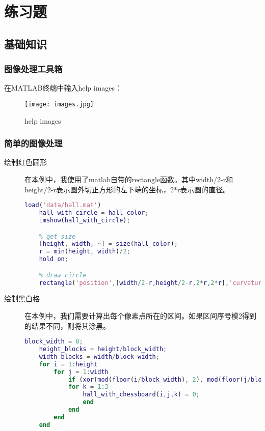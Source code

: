 \documentclass[a4paper]{article}
\begin{document}
\section{练习题}

\subsection{基础知识}
\subsubsection{图像处理工具箱}
\par 在MATLAB终端中输入help images：

\begin{figure}[ht]
     \centering
     \texttt{[image: images.jpg]}
     \caption{help images}
    \label{fig:help images}
\end{figure}

\subsubsection{简单的图像处理}
\begin{description}
    \item[绘制红色圆形] 
    \par 在本例中，我使用了matlab自带的rectangle函数。其中width/2-r和height/2-r表示圆外切正方形的左下端的坐标，2*r表示圆的直径。
    \begin{lstlisting}[language=matlab, caption=绘制红色圆形]
    load('data/hall.mat')
    hall_with_circle = hall_color;
    imshow(hall_with_circle);

    % get size
    [height, width, ~] = size(hall_color);
    r = min(height, width)/2;
    hold on;

    % draw circle
    rectangle('position',[width/2-r,height/2-r,2*r,2*r],'curvature',[1,1],'EdgeColor','r');
    \end{lstlisting}
    
    \item[绘制黑白格]
    \par 在本例中，我们需要计算出每个像素点所在的区间。如果区间序号模2得到的结果不同，则将其涂黑。
    \begin{lstlisting}[language=matlab, caption=绘制棋盘]
    block_width = 8;
    height_blocks = height/block_width;
    width_blocks = width/block_width;
    for i = 1:height
        for j = 1:width
            if (xor(mod(floor(i/block_width), 2), mod(floor(j/block_width),2) == 1))
            for k = 1:3
                hall_with_chessboard(i,j,k) = 0;
                end
            end
        end
    end
    \end{lstlisting}
\end{description}
\end{document}
